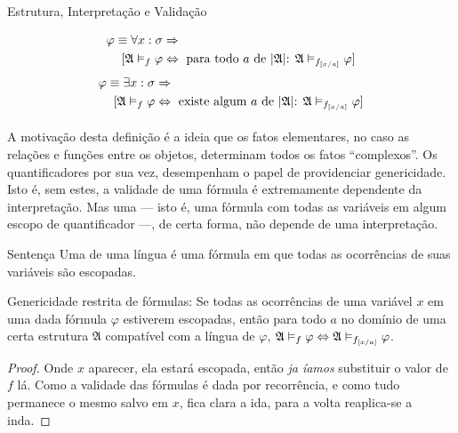 \begin{definition}{Estrutura, Interpretação e Validação}
\begin{align*}
                    [\mathfrak{A}\vDash_f\varphi&\BIM\mathfrak A\vDash_f\neg\sigma\text{ ou }\mathfrak A\vDash_f\psi]
            \end{align*}
            \begin{align*}
                \varphi\equiv \forall x:\sigma&\RAR\\
                    [\mathfrak{A}\vDash_f\varphi&\BIM\text{ para todo $a$ de    $|\mathfrak A|$: }
                    \mathfrak A\vDash_{f_{[x\slash{a}]}}\varphi]
            \end{align*}
            \begin{align*}
                \varphi\equiv \exists x:\sigma&\RAR\\
                    [\mathfrak{A}\vDash_f\varphi&\BIM\text{ existe algum $a$ de $|\mathfrak A|$: }
                    \mathfrak A\vDash_{f_{[x\slash{a}]}}\varphi]
            \end{align*}
        \paragraph{}
            A motivação desta definição é a ideia que os fatos elementares,
            no caso as relações e funções entre os objetos, determinam todos 
            os fatos ``complexos''. Os quantificadores por sua vez, desempenham o papel de providenciar
            genericidade. Isto é, sem estes, a validade de uma fórmula é 
            extremamente dependente da interpretação. Mas uma  
            --- isto é, uma fórmula com todas as variáveis em algum escopo de 
            quantificador ---, de certa forma, não depende de uma interpretação. 
    \end{definition}

    \begin{definition}{Sentença}
        Uma  de uma língua é uma fórmula em que todas as ocorrências 
        de suas variáveis são escopadas.
    \end{definition}

    \begin{lemma}{Genericidade restrita de fórmulas:}
        Se todas as ocorrências de uma variável $x$ em uma dada fórmula $\varphi$ 
        estiverem escopadas, então para todo $a$ no domínio de uma certa estrutura 
        $\mathfrak{A}$ compatível com a língua de $\varphi$, $\mathfrak{A}\vDash_{f}
        \varphi\Leftrightarrow\mathfrak{A}\vDash_{f_{[x\slash{a}]}}\varphi$.
    \end{lemma}
    \begin{proof}
        Onde $x$ aparecer, ela estará escopada, então \emph{ja íamos} substituir
        o valor de $f$ lá. Como a validade das fórmulas é dada por recorrência,
        e como tudo permanece o mesmo salvo em $x$, fica clara a ida, para a volta 
        reaplica-se a inda.\eop
    \end{proof}

